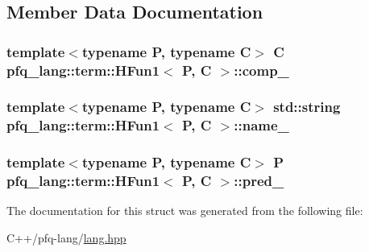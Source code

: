 \subsection{Member Data Documentation}
\hypertarget{structpfq__lang_1_1term_1_1HFun1_a16b8c06ef73b339272e21dbfd5be962c}{
\subsubsection[{comp\-\_\-}]{\setlength{\rightskip}{0pt plus 5cm}template$<$typename P, typename C$>$ C {\bf pfq\-\_\-lang\-::term\-::\-H\-Fun1}$<$ P, C $>$\-::comp\-\_\-}}\label{structpfq__lang_1_1term_1_1HFun1_a16b8c06ef73b339272e21dbfd5be962c}
\hypertarget{structpfq__lang_1_1term_1_1HFun1_ac37e99de5e6350b504a03f0e03d725c4}{
\subsubsection[{name\-\_\-}]{\setlength{\rightskip}{0pt plus 5cm}template$<$typename P, typename C$>$ std\-::string {\bf pfq\-\_\-lang\-::term\-::\-H\-Fun1}$<$ P, C $>$\-::name\-\_\-}}\label{structpfq__lang_1_1term_1_1HFun1_ac37e99de5e6350b504a03f0e03d725c4}
\hypertarget{structpfq__lang_1_1term_1_1HFun1_ac15b6e2665e60ad7f1700797c7677ea6}{
\subsubsection[{pred\-\_\-}]{\setlength{\rightskip}{0pt plus 5cm}template$<$typename P, typename C$>$ P {\bf pfq\-\_\-lang\-::term\-::\-H\-Fun1}$<$ P, C $>$\-::pred\-\_\-}}\label{structpfq__lang_1_1term_1_1HFun1_ac15b6e2665e60ad7f1700797c7677ea6}


The documentation for this struct was generated from the following file\-:\begin{DoxyCompactItemize}
\item 
C++/pfq-\/lang/\hyperlink{lang_8hpp}{lang.\-hpp}\end{DoxyCompactItemize}
